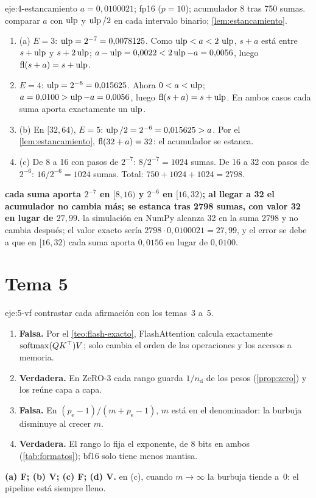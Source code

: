 \begin{solucion}{eje:4-estancamiento}
\datos $a=0{,}0100021$; fp16 ($p=10$); acumulador $8$ tras 750 sumas.
\planteamiento comparar $a$ con $\operatorname{ulp}$ y $\operatorname{ulp}/2$ en cada intervalo binario; \cref{lem:estancamiento}.
\pasos
\begin{enumerate}[label=\arabic*.]
  \item (a) $E=3$: $\operatorname{ulp}=2^{-7}=0{,}0078125$. Como $\operatorname{ulp}<a<2\,\operatorname{ulp}$, $s+a$ está entre $s+\operatorname{ulp}$ y $s+2\operatorname{ulp}$; $a-\operatorname{ulp}=0{,}0022<2\operatorname{ulp}-a=0{,}0056$, luego $\operatorname{fl}(s+a)=s+\operatorname{ulp}$.
  \item $E=4$: $\operatorname{ulp}=2^{-6}=0{,}015625$. Ahora $0<a<\operatorname{ulp}$; $a=0{,}0100>\operatorname{ulp}-a=0{,}0056$, luego $\operatorname{fl}(s+a)=s+\operatorname{ulp}$. En ambos casos cada suma aporta exactamente un $\operatorname{ulp}$.
  \item (b) En $[32,64)$, $E=5$: $\operatorname{ulp}/2=2^{-6}=0{,}015625>a$. Por el \cref{lem:estancamiento}, $\operatorname{fl}(32+a)=32$: el acumulador se estanca.
  \item (c) De 8 a 16 con pasos de $2^{-7}$: $8/2^{-7}=1024$ sumas. De 16 a 32 con pasos de $2^{-6}$: $16/2^{-6}=1024$ sumas. Total: $750+1024+1024=2798$. \qedhere
\end{enumerate}
\resultado \textbf{cada suma aporta $2^{-7}$ en $[8,16)$ y $2^{-6}$ en $[16,32)$; al llegar a 32 el acumulador no cambia más; se estanca tras 2798 sumas, con valor 32 en lugar de $27{,}99$.}
\comprobacion la simulación en NumPy alcanza 32 en la suma 2798 y no cambia después; el valor exacto sería $2798\cdot 0{,}0100021=27{,}99$, y el error se debe a que en $[16,32)$ cada suma aporta $0{,}0156$ en lugar de $0{,}0100$.
\end{solucion}

\section{Tema 5}

\begin{solucion}{eje:5-vf}
\planteamiento contrastar cada afirmación con los temas~3 a~5.
\pasos
\begin{enumerate}[label=(\alph*)]
  \item \textbf{Falsa.} Por el \cref{teo:flash-exacto}, FlashAttention calcula exactamente $\operatorname{softmax}(QK^{\top})V$; solo cambia el orden de las operaciones y los accesos a memoria.
  \item \textbf{Verdadera.} En ZeRO-3 cada rango guarda $1/n_{\mathrm{d}}$ de los pesos (\cref{prop:zero}) y los reúne capa a capa.
  \item \textbf{Falsa.} En $(p_{\mathrm{e}}-1)/(m+p_{\mathrm{e}}-1)$, $m$ está en el denominador: la burbuja disminuye al crecer $m$.
  \item \textbf{Verdadera.} El rango lo fija el exponente, de 8 bits en ambos (\cref{tab:formatos}); bf16 solo tiene menos mantisa.
\end{enumerate}
\resultado \textbf{(a) F; (b) V; (c) F; (d) V.}
\comprobacion en (c), cuando $m\to\infty$ la burbuja tiende a~0: el pipeline está siempre lleno.
\end{solucion}

